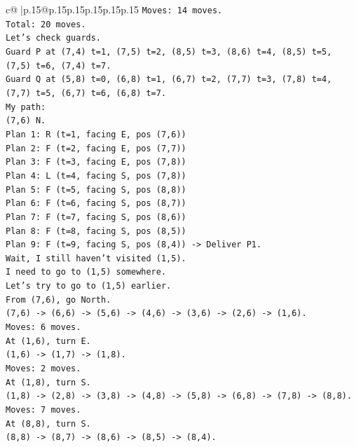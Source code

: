 \documentclass{article}
\begin{document}
{\begin{supertabular}{c@{$\;$}|p{.15\linewidth}@{}p{.15\linewidth}p{.15\linewidth}p{.15\linewidth}p{.15\linewidth}p{.15\linewidth}}
{{{\texttt{Moves: 14 moves.} \\
\texttt{Total: 20 moves.} \\
\texttt{Let's check guards.} \\
\texttt{Guard P at (7,4) t=1, (7,5) t=2, (8,5) t=3, (8,6) t=4, (8,5) t=5, (7,5) t=6, (7,4) t=7.} \\
\texttt{Guard Q at (5,8) t=0, (6,8) t=1, (6,7) t=2, (7,7) t=3, (7,8) t=4, (7,7) t=5, (6,7) t=6, (6,8) t=7.} \\
\texttt{My path:} \\
\texttt{(7,6) N.} \\
\texttt{Plan 1: R (t=1, facing E, pos (7,6))} \\
\texttt{Plan 2: F (t=2, facing E, pos (7,7))} \\
\texttt{Plan 3: F (t=3, facing E, pos (7,8))} \\
\texttt{Plan 4: L (t=4, facing S, pos (7,8))} \\
\texttt{Plan 5: F (t=5, facing S, pos (8,8))} \\
\texttt{Plan 6: F (t=6, facing S, pos (8,7))} \\
\texttt{Plan 7: F (t=7, facing S, pos (8,6))} \\
\texttt{Plan 8: F (t=8, facing S, pos (8,5))} \\
\texttt{Plan 9: F (t=9, facing S, pos (8,4)) {-}> Deliver P1.} \\
\texttt{Wait, I still haven't visited (1,5).} \\
\texttt{I need to go to (1,5) somewhere.} \\
\texttt{Let's try to go to (1,5) earlier.} \\
\texttt{From (7,6), go North.} \\
\texttt{(7,6) {-}> (6,6) {-}> (5,6) {-}> (4,6) {-}> (3,6) {-}> (2,6) {-}> (1,6).} \\
\texttt{Moves: 6 moves.} \\
\texttt{At (1,6), turn E.} \\
\texttt{(1,6) {-}> (1,7) {-}> (1,8).} \\
\texttt{Moves: 2 moves.} \\
\texttt{At (1,8), turn S.} \\
\texttt{(1,8) {-}> (2,8) {-}> (3,8) {-}> (4,8) {-}> (5,8) {-}> (6,8) {-}> (7,8) {-}> (8,8).} \\
\texttt{Moves: 7 moves.} \\
\texttt{At (8,8), turn S.} \\
\texttt{(8,8) {-}> (8,7) {-}> (8,6) {-}> (8,5) {-}> (8,4).} \\
}}}
\end{supertabular}}
\end{document}
